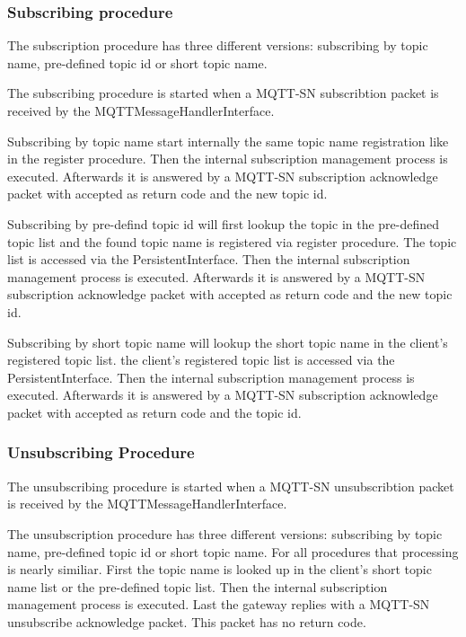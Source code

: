 \subsubsection{Subscribing procedure}
The subscription procedure has three different versions: subscribing by topic name, pre-defined topic id or short topic name.

The subscribing procedure is started when a MQTT-SN subscribtion packet is received by the MQTTMessageHandlerInterface.

Subscribing by topic name start internally the same topic name registration like in the register procedure. 
Then the internal subscription management process is executed.
Afterwards it is answered by a MQTT-SN subscription acknowledge packet with accepted as return code and the new topic id.

Subscribing by pre-defind topic id will first lookup the topic in the pre-defined topic list and the found topic name is registered via register procedure.
The topic list is accessed via the PersistentInterface.
Then the internal subscription management process is executed.
Afterwards it is answered by a MQTT-SN subscription acknowledge packet with accepted as return code and the new topic id.

Subscribing by short topic name will lookup the short topic name in the client's registered topic list.
the client's registered topic list is accessed via the PersistentInterface.
Then the internal subscription management process is executed.
Afterwards it is answered by a MQTT-SN subscription acknowledge packet with accepted as return code and the topic id.

\subsubsection{Unsubscribing Procedure}
The unsubscribing procedure is started when a MQTT-SN unsubscribtion packet is received by the MQTTMessageHandlerInterface. 

The unsubscription procedure has three different versions: subscribing by topic name, pre-defined topic id or short topic name.
For all procedures that processing is nearly similiar. First the topic name is looked up in the client's short topic name list or the pre-defined topic list.
Then the internal subscription management process is executed.
Last the gateway replies with a MQTT-SN unsubscribe acknowledge packet. This packet has no return code.

